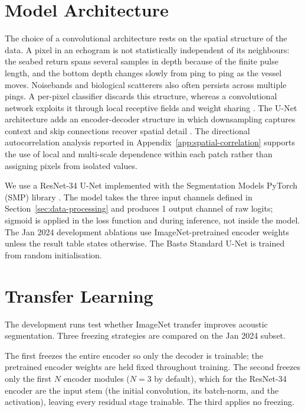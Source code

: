 \section{Model Architecture}

The choice of a convolutional architecture rests on the spatial structure of the data. A pixel in an echogram is not statistically independent of its neighbours: the seabed return spans several samples in depth because of the finite pulse length, and the bottom depth changes slowly from ping to ping as the vessel moves. Noisebands and biological scatterers also often persists across multiple pings. A per-pixel classifier discards this structure, whereas a convolutional network exploits it through local receptive fields and weight sharing \cite{lecun_deep_2015}. The U-Net architecture adds an encoder-decoder structure in which downsampling captures context and skip connections recover spatial detail \cite{ronneberger_unet_2015}. The directional autocorrelation analysis reported in Appendix~\ref{app:spatial-correlation} supports the use of local and multi-scale dependence within each patch rather than assigning pixels from isolated values.

We use a ResNet-34 U-Net implemented with the Segmentation Models PyTorch (SMP) library \cite{iakubovskii_segmentation_2019,he_deep_2016}. The model takes the three input channels defined in Section~\ref{sec:data-processing} and produces 1 output channel of raw logits; sigmoid is applied in the loss function and during inference, not inside the model. The Jan 2024 development ablations use ImageNet-pretrained encoder weights unless the result table states otherwise. The Bast\o{} Standard U-Net is trained from random initialisation.


\section{Transfer Learning}
\label{sec:transfer-learning-method}

The development runs test whether ImageNet transfer improves acoustic segmentation. Three freezing strategies are compared on the Jan 2024 subset.

The first freezes the entire encoder so only the decoder is trainable; the pretrained encoder weights are held fixed throughout training. The second freezes only the first $N$ encoder modules ($N=3$ by default), which for the ResNet-34 encoder are the input stem (the initial convolution, its batch-norm, and the activation), leaving every residual stage trainable. The third applies no freezing.

